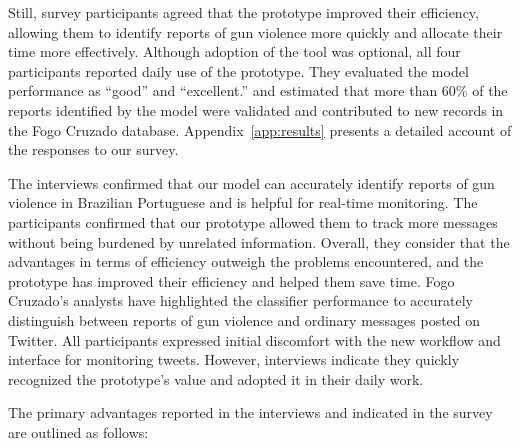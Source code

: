 \documentclass[11pt,letterpaper]{article}
\begin{document}
Still, survey participants agreed that the prototype improved their efficiency, allowing them to identify reports of gun violence more quickly and allocate their time more effectively. Although adoption of the tool was optional, all four participants reported daily use of the prototype. They evaluated the model performance as ``good'' and ``excellent.'' and estimated that more than 60\% of the reports identified by the model were validated and contributed to new records in the Fogo Cruzado database. Appendix~\ref{app:results} presents a detailed account of the responses to our survey.

The interviews confirmed that our model can accurately identify reports of gun violence in Brazilian Portuguese and is helpful for real-time monitoring. The participants confirmed that our prototype allowed them to track more messages without being burdened by unrelated information. Overall, they consider that the advantages in terms of efficiency outweigh the problems encountered, and the prototype has improved their efficiency and helped them save time. Fogo Cruzado's analysts have highlighted the classifier performance to accurately distinguish between reports of gun violence and ordinary messages posted on Twitter. All participants expressed initial discomfort with the new workflow and interface for monitoring tweets. However, interviews indicate they quickly recognized the prototype's value and adopted it in their daily work. 

The primary advantages reported in the interviews and indicated in the survey are outlined as follows:
\end{document}
